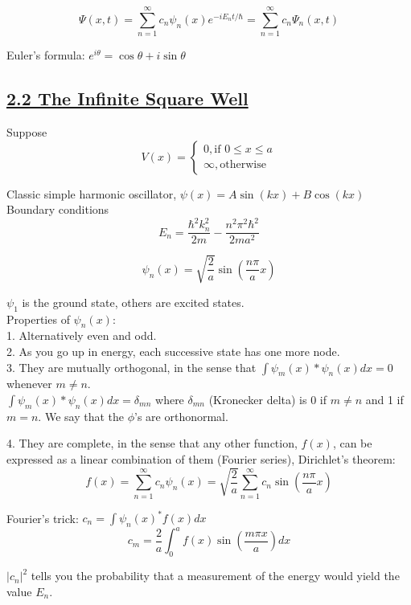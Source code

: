 $$\Psi(x, t) = \sum_{n=1}^{\infty} c_n \psi_n(x) e^{-iE_n t / \hbar} = \sum_{n=1}^{\infty} c_n \Psi_n(x, t)$$

Euler's formula: $e^{i \theta} = \cos \theta + i \sin \theta$

\subsection{\underline{2.2 The Infinite Square Well}}

Suppose
    $$V(x) = \begin{cases} 0, \textrm{if } 0 \leq x \leq a \\ \infty, \textrm{otherwise} \end{cases}$$

Classic simple harmonic oscillator, $\psi(x) = A \sin(kx) + B \cos(kx)$ \\

Boundary conditions \\

$$E_n = \frac{\hbar^2 k_n^2}{2m} - \frac{n^2 \pi^2 \hbar^2}{2ma^2}$$

$$\psi_n(x) = \sqrt{\frac{2}{a}} \sin(\frac{n \pi}{a} x)$$

$\psi_1$ is the ground state, others are excited states. \\

Properties of $\psi_n(x)$: \\
1. Alternatively even and odd. \\
2. As you go up in energy, each successive state has one more node. \\
3. They are mutually orthogonal, in the sense that $\int \psi_m(x)* \psi_n(x) dx = 0$ whenever $m \neq n$. \\

$\int \psi_m (x)* \psi_n(x) dx = \delta_{mn}$
where $\delta_{mn}$ (Kronecker delta) is 0 if $m \neq n$ and 1 if $m=n$. We say that the $\phi$'s are orthonormal.

4. They are complete, in the sense that any other function, $f(x)$, can be expressed as a linear combination of them (Fourier series), Dirichlet's theorem:
    $$f(x) = \sum_{n=1}^{\infty} c_n \psi_n(x) = \sqrt{\frac{2}{a}} \sum_{n=1}^{\infty} c_n \sin(\frac{n \pi}{a} x)$$

Fourier's trick: $c_n = \int \psi_n(x)^* f(x) dx$ \\
$$c_m = \frac{2}{a} \int_0^a f(x) \sin(\frac{m \pi x}{a}) dx$$

$|c_n|^2$ tells you the probability that a measurement of the energy would yield the value $E_n$. \\

